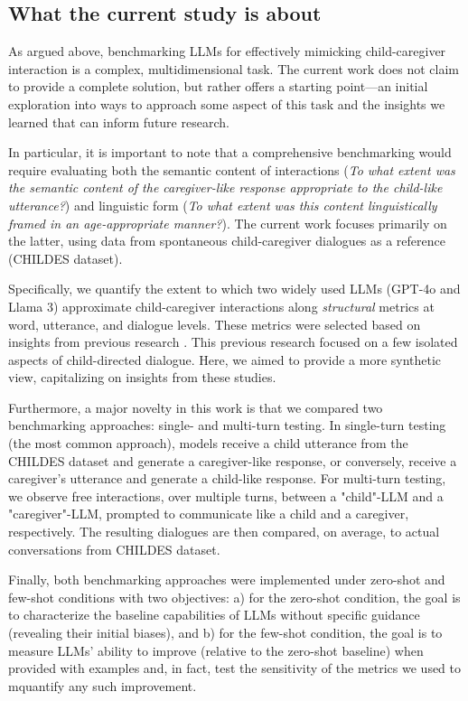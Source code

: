\subsection*{What the current study is about}

As argued above, benchmarking LLMs for effectively mimicking child-caregiver interaction is a complex, multidimensional task. The current work does not claim to provide a complete solution, but rather offers a starting point---an initial exploration into ways to approach some aspect of this task and the insights we learned that can inform future research. 

In particular, it is important to note that a comprehensive benchmarking would require evaluating both the semantic content of interactions (\textit{To what extent was the semantic content of the caregiver-like response appropriate to the child-like utterance?}) and linguistic form (\textit{To what extent was this content linguistically framed in an age-appropriate manner?}). The current work focuses primarily on the latter, using data from spontaneous child-caregiver dialogues as a reference (CHILDES dataset)\cite{macwhinney2000childes}.

Specifically, we quantify the extent to which two widely used LLMs (GPT-4o and Llama 3) approximate child-caregiver interactions along \textit{structural} metrics at word, utterance, and dialogue levels. These metrics were selected based on insights from previous research \citep{valentini2023automatic, rasanen2024age, french2024aligning}. This previous research focused on a few isolated aspects of child-directed dialogue. Here, we aimed to provide a more synthetic view, capitalizing on insights from these studies.

Furthermore, a major novelty in this work is that we compared two benchmarking approaches: single- and multi-turn testing. In single-turn testing (the most common approach), models receive a child utterance from the CHILDES dataset and generate a caregiver-like response, or conversely, receive a caregiver's utterance and generate a child-like response. For multi-turn testing, we observe free interactions, over multiple turns, between a "child"-LLM and a "caregiver"-LLM, prompted to communicate like a child and a caregiver, respectively. The resulting dialogues are then compared, on average, to actual conversations from CHILDES dataset.

Finally, both benchmarking approaches were implemented under zero-shot and few-shot conditions with two objectives: a) for the zero-shot condition, the goal is to characterize the baseline capabilities of LLMs without specific guidance (revealing their initial biases), and b) for the few-shot condition, the goal is to measure LLMs' ability to improve (relative to the zero-shot baseline) when provided with examples and, in fact, test the sensitivity of the metrics we used to mquantify any such improvement.


